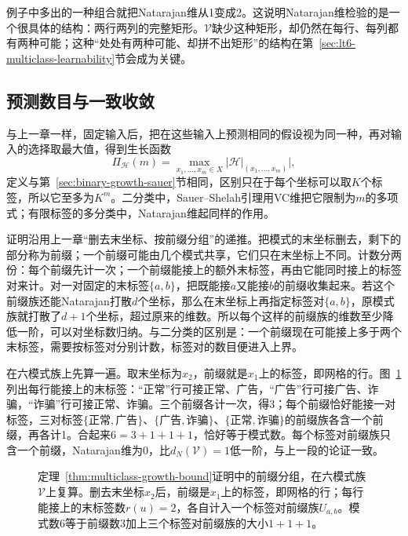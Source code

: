例子中多出的一种组合就把Natarajan维从1变成2。这说明Natarajan维检验的是一个很具体的结构：两行两列的完整矩形。$\mathcal V$缺少这种矩形，却仍然在每行、每列都有两种可能；这种“处处有两种可能、却拼不出矩形”的结构在第~\ref{sec:lt6-multiclass-learnability}节会成为关键。

\subsection{预测数目与一致收敛}
\label{sec:lt6-finite-label-counting}

与上一章一样，固定输入后，把在这些输入上预测相同的假设视为同一种，再对输入的选择取最大值，得到生长函数
\[
 \Pi_{\mathcal H}(m)=\max_{x_1,\ldots,x_m\in X}\bigl|\mathcal H|_{(x_1,\ldots,x_m)}\bigr|,
\]
定义与第~\ref{sec:binary-growth-sauer}节相同，区别只在于每个坐标可以取$K$个标签，所以它至多为$K^m$。二分类中，Sauer--Shelah引理用VC维把它限制为$m$的多项式；有限标签的多分类中，Natarajan维起同样的作用。

证明沿用上一章“删去末坐标、按前缀分组”的递推。把模式的末坐标删去，剩下的部分称为前缀；一个前缀可能由几个模式共享，它们只在末坐标上不同。计数分两份：每个前缀先计一次；一个前缀能接上的额外末标签，再由它能同时接上的标签对来计。对一对固定的末标签$\{a,b\}$，把既能接$a$又能接$b$的前缀收集起来。若这个前缀族还能Natarajan打散$d$个坐标，那么在末坐标上再指定标签对$\{a,b\}$，原模式族就打散了$d+1$个坐标，超过原来的维数。所以每个这样的前缀族的维数至少降低一阶，可以对坐标数归纳。与二分类的区别是：一个前缀现在可能接上多于两个末标签，需要按标签对分别计数，标签对的数目便进入上界。

在六模式族上先算一遍。取末坐标为$x_2$，前缀就是$x_1$上的标签，即网格的行。图~\ref{fig:lt6-prefix-counting}列出每行能接上的末标签：“正常”行可接正常、广告，“广告”行可接广告、诈骗，“诈骗”行可接正常、诈骗。三个前缀各计一次，得3；每个前缀恰好能接一对标签，三对标签$\{\text{正常},\text{广告}\}$、$\{\text{广告},\text{诈骗}\}$、$\{\text{正常},\text{诈骗}\}$的前缀族各含一个前缀，再各计1。合起来$6=3+1+1+1$，恰好等于模式数。每个标签对前缀族只含一个前缀，Natarajan维为0，比$d_N(\mathcal V)=1$低一阶，与上一段的论证一致。

\begin{figure}[htbp]
  \centering
  
  \caption{定理~\ref{thm:multiclass-growth-bound}证明中的前缀分组，在六模式族$\mathcal V$上复算。删去末坐标$x_2$后，前缀是$x_1$上的标签，即网格的行；每行能接上的末标签数$r(u)=2$，各自计入一个标签对前缀族$U_{a,b}$。模式数$6$等于前缀数$3$加上三个标签对前缀族的大小$1+1+1$。}
  \label{fig:lt6-prefix-counting}
\end{figure}

